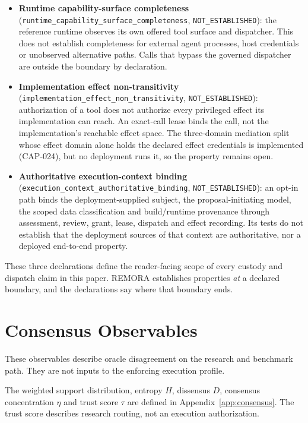 \documentclass[10pt,twocolumn]{article}
\newcommand{\trust}{\tau}
\begin{document}
\begin{itemize}
\item \textbf{Runtime capability-surface completeness}
  (\texttt{runtime\_capability\_surface\_completeness},
  \texttt{NOT\_ESTABLISHED}): the reference runtime observes its own
  offered tool surface and dispatcher. This does not establish
  completeness for external agent processes, host credentials or
  unobserved alternative paths. Calls that bypass the governed
  dispatcher are outside the boundary by declaration.
\item \textbf{Implementation effect non-transitivity}
  (\texttt{implementation\_effect\_non\_transitivity},
  \texttt{NOT\_ESTABLISHED}): authorization of a tool does not
  authorize every privileged effect its implementation can reach. An
  exact-call lease binds the call, not the implementation's reachable
  effect space. The three-domain mediation split whose effect domain
  alone holds the declared effect credentials is implemented (CAP-024),
  but no deployment runs it, so the property remains open.
\item \textbf{Authoritative execution-context binding}
  (\texttt{execution\_context\_authoritative\_binding},
  \texttt{NOT\_ESTABLISHED}): an opt-in path binds the
  deployment-supplied subject, the proposal-initiating model, the scoped
  data classification and build/runtime provenance through assessment,
  review, grant, lease, dispatch and effect recording. Its tests do not
  establish that the deployment sources of that context are
  authoritative, nor a deployed end-to-end property.
\end{itemize}

These three declarations define the reader-facing scope of every custody
and dispatch claim in this paper. REMORA establishes properties
\emph{at} a declared boundary, and the declarations say where that
boundary ends.

\section{Consensus Observables}
\label{sec:method}

These observables describe oracle disagreement on the research and
benchmark path. They are not inputs to the enforcing execution profile.

The weighted support distribution, entropy $H$, dissensus $D$,
consensus concentration $\eta$ and trust score $\trust$ are defined in
Appendix~\ref{app:consensus}. The trust score describes research
routing, not an execution authorization.
\end{document}
